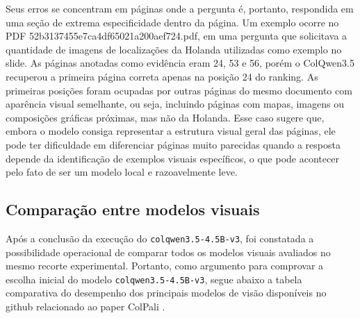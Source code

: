 Seus erros se concentram em páginas onde a pergunta é, portanto, respondida em uma seção de extrema especificidade dentro da página. Um exemplo  ocorre no PDF 52b3137455e7ca4df65021a200aef724.pdf, em uma pergunta que solicitava a quantidade de imagens de localizações da Holanda utilizadas como exemplo no slide. As páginas anotadas como evidência eram 24, 53 e 56, porém o ColQwen3.5 recuperou a primeira página correta apenas na posição 24 do ranking. As primeiras posições foram ocupadas por outras páginas do mesmo documento com aparência visual semelhante, ou seja, incluindo páginas com mapas, imagens ou composições gráficas próximas, mas não da Holanda. Esse caso sugere que, embora o modelo consiga representar a estrutura visual geral das páginas, ele pode ter dificuldade em diferenciar páginas muito parecidas quando a resposta depende da identificação de exemplos visuais específicos, o que pode acontecer pelo fato de ser um modelo local e razoavelmente leve.

\subsection{Comparação entre modelos visuais}
\label{subsec:colvision-comparacao-modelos}

Após a conclusão da execução do \texttt{colqwen3.5-4.5B-v3}, foi constatada a possibilidade operacional de comparar todos os modelos visuais avaliados no mesmo recorte experimental. Portanto, como argumento para comprovar a escolha inicial do modelo \texttt{colqwen3.5-4.5B-v3}, segue abaixo a tabela comparativa do desempenho dos principais modelos de visão disponíveis no github relacionado ao paper ColPali\cite{COLPALI_GITHUB} .

\begin{table}[htbp]
\centering
\caption{Comparação global entre modelos visuais: FHM e Hit@k.}
\label{tab:comparacao-colvision-hit}
\scriptsize
{}
\end{table}

